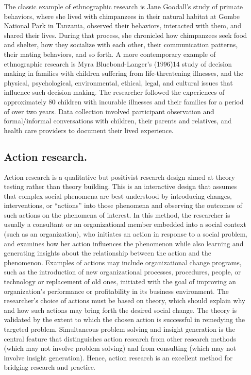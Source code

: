 The classic example of ethnographic research is Jane Goodall's study of primate behaviors, where she lived with chimpanzees in their natural habitat at Gombe National Park in Tanzania, observed their behaviors, interacted with them, and shared their lives. During that process, she chronicled how chimpanzees seek food and shelter, how they socialize with each other, their communication patterns, their mating behaviors, and so forth. A more contemporary example of ethnographic research is Myra Bluebond-Langer's (1996)14 study of decision making in families with children suffering from life-threatening illnesses, and the physical, psychological, environmental, ethical, legal, and cultural issues that influence such decision-making. The researcher followed the experiences of approximately 80 children with incurable illnesses and their families for a period of over two years. Data collection involved participant observation and formal/informal conversations with children, their parents and relatives, and health care providers to document their lived experience.

\subsection{Action research.} Action research is a qualitative but positivist research design aimed at theory testing rather than theory building. This is an interactive design that assumes that complex social phenomena are best understood by introducing changes, interventions, or ``actions'' into those phenomena and observing the outcomes of such actions on the phenomena of interest. In this method, the researcher is usually a consultant or an organizational member embedded into a social context (such as an organization), who initiates an action in response to a social problem, and examines how her action influences the phenomenon while also learning and generating insights about the relationship between the action and the phenomenon. Examples of actions may include organizational change programs, such as the introduction of new organizational processes, procedures, people, or technology or replacement of old ones, initiated with the goal of improving an organization's performance or profitability in its business environment. The researcher's choice of actions must be based on theory, which should explain why and how such actions may bring forth the desired social change. The theory is validated by the extent to which the chosen action is successful in remedying the targeted problem. Simultaneous problem solving and insight generation is the central feature that distinguishes action research from other research methods (which may not involve problem solving) and from consulting (which may not involve insight generation). Hence, action research is an excellent method for bridging research and practice.


